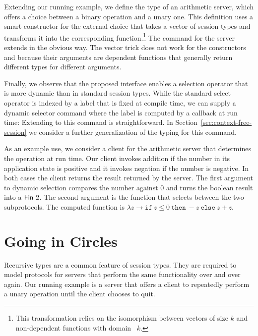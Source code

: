 \documentclass[acmsmall,screen]{acmart}
\begin{document}
Extending our running example, we define the type of an arithmetic server,
which offers a choice between a binary operation and a unary one. 
This definition uses a smart constructor {\Aamp} for the external choice that
takes a vector of session types and transforms it into the
corresponding function.\footnote{This transformation relies on the
  isomorphism between vectors of size $k$ and non-dependent functions with domain {\AFin~$k$}.}
\stExampleArithP
The command for the server extends in the obvious way. The vector
trick does not work for the {\ACommand} constructors {\ACSELECT} and
{\ACCHOICE} because their arguments are dependent functions that
generally return different types for different arguments.
\stArithpCommand

Finally, we observe that the proposed interface enables a
selection operator that is more dynamic than in standard session types. While the standard
select operator is indexed by a label that is fixed at compile time,
we can supply a dynamic selector command where the label is computed
by a callback  at run time:
\stDynamicBranchingCommand
Extending {\Aexecutor} to this command is straightforward.
In Section~\ref{sec:context-free-session} we consider a further
generalization of the typing for this command.

As an example use, we consider a client for the arithmetic server that
determines the operation at run time. Our client invokes addition if
the number in its application state is positive and it invokes
negation if the number is negative. In both cases the client returns
the result returned by the server.
\stArithpClient
The first argument to dynamic selection compares the number against
$0$ and turns the boolean result into a $\AFin~2$. The second argument
is the function that selects between the two subprotocols. The
computed function is $\lambda z \to \mathtt{if}\ z\le0\ \mathtt{then}\
-z\ \mathtt{else}\ z+z$. 

\section{Going in Circles}
\label{sec:going-circles}


Recursive types are a common feature of session types. They are required
to model protocols for servers that perform the same functionality
over and over again. Our running example is a server that offers
a client to repeatedly perform a unary operation until the client
chooses to quit.
\end{document}
